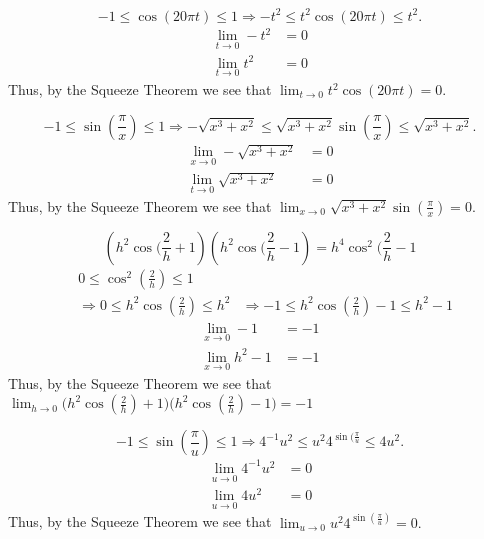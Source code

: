 \documentclass{hwset}
\begin{document}
\be
	\item \begin{solution}
		\begin{equation*}
			-1\le \cos(20\pi t) \le 1 \Rightarrow -t^2 \le t^{2}\cos(20\pi t) \le t^2.
		\end{equation*}
		\begin{align*}
			\lim_{t\to 0} -t^2 &= 0 \\
			\lim_{t\to 0} t^2 &= 0 
		\end{align*}
		Thus, by the Squeeze Theorem we see that $\lim_{t\to 0}t^{2}\cos(20\pi t)=0.$
	\end{solution}
	\item \begin{solution}
		\begin{equation*}
			-1\le \sin(\frac{\pi}{x}) \le 1 \Rightarrow -\sqrt{x^3 +x^2} \le \sqrt{x^3
			+ x^2} \sin(\frac{\pi}{x}) \le \sqrt{x^3 + x^2}.
		\end{equation*}
		\begin{align*}
			\lim_{x\to 0} -\sqrt{x^3+x^2} &= 0 \\
			\lim_{t\to 0} \sqrt{x^3+x^2} &= 0 
		\end{align*}
		Thus, by the Squeeze Theorem we see that $\lim_{x\to
		0}\sqrt{x^3+x^2}\sin(\frac{\pi}{x})=0.$
	\end{solution}
	\item \begin{solution}
		\begin{equation*}
			\left(h^2 \cos(\frac{2}{h} + 1\right)\left(h^2 \cos(\frac{2}{h} - 1\right)
				= h^4 \cos^2(\frac{2}{h} - 1
		\end{equation*}
		\begin{align*}
			&0 \le \cos^2(\frac{2}{h}) \le 1 \\
			&\Rightarrow 0 \le h^2\cos(\frac{2}{h})\le h^2 
			&\Rightarrow -1 \le h^2\cos(\frac{2}{h}) - 1 \le h^2 - 1
		\end{align*}
		\begin{align*}
			\lim_{x\to 0} - 1 &= -1 \\
			\lim_{x\to 0} h^2 - 1 &= -1 
		\end{align*}
		Thus, by the Squeeze Theorem we see that 
		$\lim_{h\to 0}\Big(h^{2}\cos(\frac{2}{h})+1\Big)\Big(h^{2}\cos(\frac{2}{h})-1\Big)=-1$
	\end{solution}
	\item \begin{solution}
		\begin{equation*}
			-1\le \sin(\frac{\pi}{u}) \le 1 \Rightarrow 4^{-1} u^2 \le u^2
			4^{\sin(\frac{\pi}{u}} \le 4 u^2.
		\end{equation*}
		\begin{align*}
			\lim_{u\to 0} 4^{-1} u^2 &= 0 \\
			\lim_{u\to 0} 4 u^2 &= 0 
		\end{align*}
		Thus, by the Squeeze Theorem we see that $\lim_{u\to
		0} u^2 4^{\sin(\frac{\pi}{u})}=0.$
	\end{solution}
\ee
\end{document}
